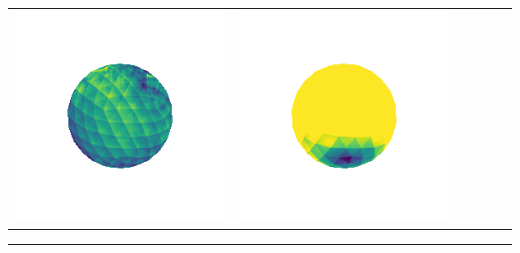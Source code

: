 \begin{tabularx}{\linewidth}{@{}Y@{}Y@{}Y@{}Y@{}Y@{}Y@{}}
\includegraphics[width=\linewidth]{semisynthetic/20150514_1_marrnet_err.png} &
\includegraphics[width=\linewidth]{semisynthetic/20150514_1_ef_err.png} \\
\end{tabularx}
\begin{center}\rule{0.5\linewidth}{\linethickness}\end{center}

